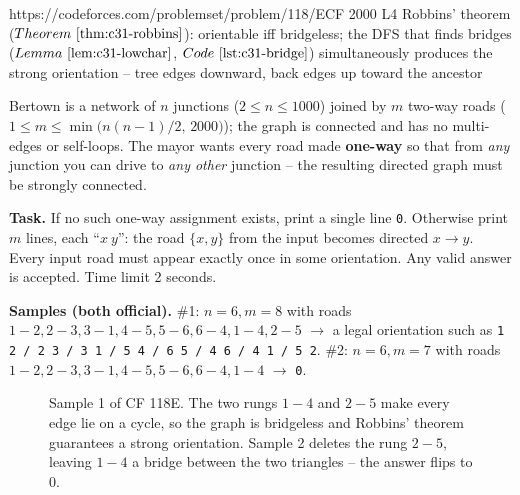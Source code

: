   {https://codeforces.com/problemset/problem/118/E}{CF 2000 L4}
  {Robbins' theorem (\(\thmref{c31-robbins}\)): orientable iff bridgeless; the DFS that
   finds bridges (\(\lemref{c31-lowchar}\), \(\coderef{c31-bridge}\)) simultaneously produces
   the strong orientation -- tree edges downward, back edges up toward the ancestor}

\begin{problemstatement}
Bertown is a network of \(n\) junctions (\(2\le n\le 1000\)) joined by \(m\) two-way roads
(\(1\le m\le \min\!\bigl(n(n-1)/2,\,2000\bigr)\)); the graph is connected and has no
multi-edges or self-loops.  The mayor wants every road made \textbf{one-way} so that from
\emph{any} junction you can drive to \emph{any other} junction -- the resulting directed
graph must be strongly connected.

\textbf{Task.} If no such one-way assignment exists, print a single line \texttt{0}.
Otherwise print \(m\) lines, each ``\(x\ y\)'': the road \(\{x,y\}\) from the input becomes
directed \(x\to y\).  Every input road must appear exactly once in some orientation.  Any
valid answer is accepted.  Time limit 2 seconds.

\textbf{Samples (both official).} \#1: \(n{=}6,m{=}8\) with roads
\(1\!-\!2,2\!-\!3,3\!-\!1,4\!-\!5,5\!-\!6,6\!-\!4,1\!-\!4,2\!-\!5\) \(\to\) a legal
orientation such as \texttt{1 2 / 2 3 / 3 1 / 5 4 / 6 5 / 4 6 / 4 1 / 5 2}.  \#2:
\(n{=}6,m{=}7\) with roads \(1\!-\!2,2\!-\!3,3\!-\!1,4\!-\!5,5\!-\!6,6\!-\!4,1\!-\!4\)
\(\to\) \texttt{0}.
\end{problemstatement}

\begin{figure}[H]
\centering
{}
\caption{Sample 1 of CF 118E.  The two rungs \(1\!-\!4\) and \(2\!-\!5\) make every edge
lie on a cycle, so the graph is bridgeless and Robbins' theorem guarantees a strong
orientation.  Sample 2 deletes the rung \(2\!-\!5\), leaving \(1\!-\!4\) a bridge between
the two triangles -- the answer flips to \(0\).}
\label{fig:c31-roads}
\end{figure}


